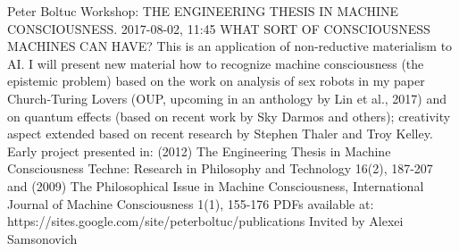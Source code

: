 \documentclass[10pt,fleqn,openany]{book} %
\begin{document}
\begin{enumerate}
		
		\paperabstract
		{Peter Boltuc}
		{Workshop: THE ENGINEERING THESIS IN MACHINE CONSCIOUSNESS.}
		{2017-08-02, 11:45}
		{WHAT SORT OF CONSCIOUSNESS MACHINES CAN HAVE? This is an application of non-reductive materialism to AI. I will present new material how to recognize machine consciousness (the epistemic problem) based on the work on analysis of sex robots in my paper Church-Turing Lovers (OUP, upcoming in an anthology by Lin et al., 2017) and on quantum effects (based on recent work by Sky Darmos and others); creativity aspect extended based on recent research by Stephen Thaler and Troy Kelley. Early project presented in: (2012) The Engineering Thesis in Machine Consciousness Techne: Research in Philosophy and Technology 16(2), 187-207 and (2009) The Philosophical Issue in Machine Consciousness, International Journal of Machine Consciousness 1(1), 155-176 PDFs available at: https://sites.google.com/site/peterboltuc/publications   Invited by Alexei Samsonovich}
		
\end{enumerate}

\end{document}
